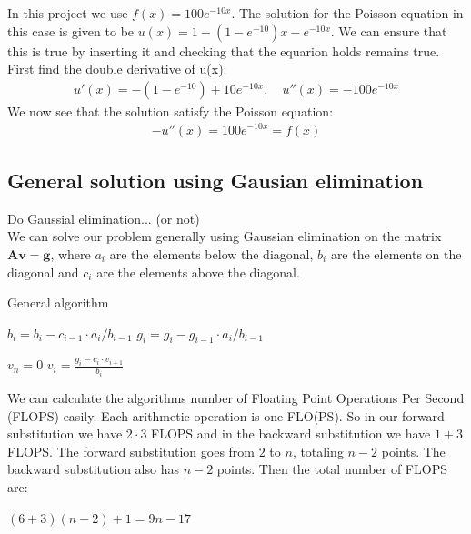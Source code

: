 \documentclass[american,a4paper,12pt]{article}
\renewcommand{\vec}[1]{\mathbf{#1}} %
\begin{document}
    In this project we use $f(x) = 100e^{-10x}$. The solution for the Poisson equation in this case is given to be $u(x) = 1 - (1 - e^{-10})x - e^{-10x}$. We can ensure that this is true by inserting it and checking that the equarion holds remains true. First find the double derivative of u(x):
    \begin{align*}
      u'(x) = -(1 - e^{-10}) + 10e^{-10x}, \quad u''(x) = -100e^{-10x}
    \end{align*}
    We now see that the solution satisfy the Poisson equation:
    \begin{align*}
      -u''(x) = 100e^{-10x} = f(x)
    \end{align*}
\subsection{General solution using Gausian elimination}
Do Gaussial elimination... (or not)\\
We can solve our problem generally using Gaussian elimination on the matrix $\vec{A}\vec{v} = \vec{g}$, where $a_i$ are the elements below the diagonal, $b_i$ are the elements on the diagonal and $c_i$ are the elements above the diagonal.

\begin{algorithm}
\caption{General algorithm}
\begin{algorithmic}[1] %
   
    \State $b_i = b_i - c_{i-1}\cdot {a_i}/{{b}_{i-1}}$ 
    \State $g_i = g_i - {g}_{i-1}\cdot {a_i}/{{b}_{i-1}}$ 
  \EndFor

  \Statex
  \State $v_n = 0$ 
    \State $v_i = \frac{g_i - c_i\cdot v_{i+1}}{b_i}$
  \EndFor
\end{algorithmic}
\end{algorithm}

We can calculate the algorithms number of Floating Point Operations Per Second (FLOPS) easily. Each arithmetic operation is one FLO(PS). So in our forward substitution we have $2 \cdot 3$ FLOPS and in the backward substitution we have $1+3$ FLOPS. The forward substitution goes from $2$ to $n$, totaling $n-2$ points. The backward substitution also has $n-2$ points. Then the total number of FLOPS are:
\begin{center}
    $(6+3)(n-2)+1 = 9n-17$
\end{center}
\end{document}
